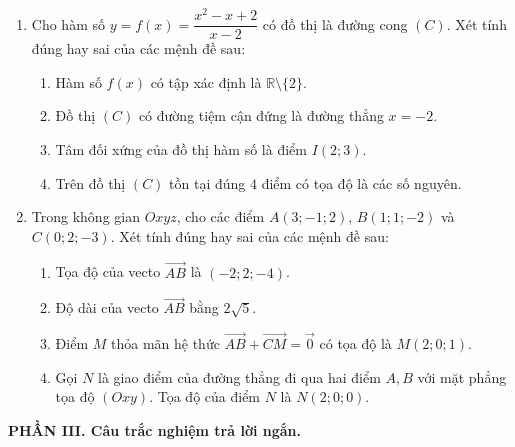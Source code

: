 \documentclass[12pt]{article}
\begin{document}
	\begin{enumerate}[label=\textbf{Câu \arabic*.}, leftmargin=*]
	
	\item Cho hàm số $y = f(x) = \dfrac{x^2 - x + 2}{x - 2}$ có đồ thị là đường cong $(C)$. Xét tính đúng hay sai của các mệnh đề sau:
	\begin{enumerate}[label=\alph*)]
		\item Hàm số $f(x)$ có tập xác định là $\mathbb{R} \setminus \{2\}$.
		\item Đồ thị $(C)$ có đường tiệm cận đứng là đường thẳng $x = -2$.
		\item Tâm đối xứng của đồ thị hàm số là điểm $I(2; 3)$.
		\item Trên đồ thị $(C)$ tồn tại đúng $4$ điểm có tọa độ là các số nguyên.
	\end{enumerate}
	
	\vspace{4mm}
	\item Trong không gian $Oxyz$, cho các điểm $A(3; -1; 2)$, $B(1; 1; -2)$ và $C(0; 2; -3)$. Xét tính đúng hay sai của các mệnh đề sau:
	\begin{enumerate}[label=\alph*)]
		\item Tọa độ của vecto $\overrightarrow{AB}$ là $(-2; 2; -4)$.
		\item Độ dài của vecto $\overrightarrow{AB}$ bằng $2\sqrt{5}$.
		\item Điểm $M$ thỏa mãn hệ thức $\overrightarrow{AB} + \overrightarrow{CM} = \vec{0}$ có tọa độ là $M(2; 0; 1)$.
		\item Gọi $N$ là giao điểm của đường thẳng đi qua hai điểm $A, B$ với mặt phẳng tọa độ $(Oxy)$. Tọa độ của điểm $N$ là $N(2; 0; 0)$.
	\end{enumerate}
	
	\end{enumerate} %
	
	\vspace{4mm}
	\noindent\textbf{PHẦN III. Câu trắc nghiệm trả lời ngắn.}
	\vspace{2mm}
	
\end{document}
